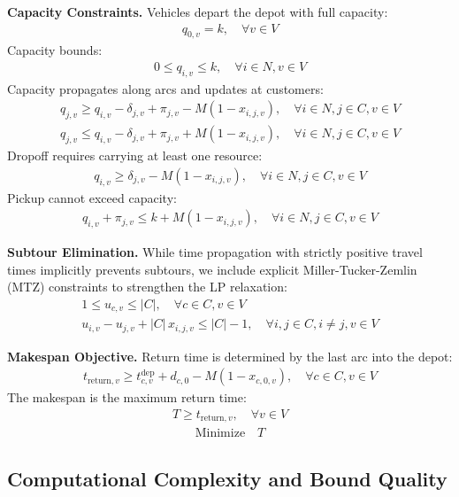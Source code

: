 \documentclass[sigconf]{acmart}
\begin{document}
\textbf{Capacity Constraints.}
Vehicles depart the depot with full capacity:
\begin{align}
q_{0,v} = k,\quad \forall v\in V
\end{align}
Capacity bounds:
\begin{align}
0 \le q_{i,v} \le k,\quad \forall i\in N, v\in V
\end{align}
Capacity propagates along arcs and updates at customers:
\begin{align}
q_{j,v} \ge q_{i,v} - \delta_{j,v} + \pi_{j,v} - M(1-x_{i,j,v}),
\quad \forall i\in N, j\in C, v\in V \\
q_{j,v} \le q_{i,v} - \delta_{j,v} + \pi_{j,v} + M(1-x_{i,j,v}),
\quad \forall i\in N, j\in C, v\in V
\end{align}
Dropoff requires carrying at least one resource:
\begin{align}
q_{i,v} \ge \delta_{j,v} - M(1-x_{i,j,v}),
\quad \forall i\in N, j\in C, v\in V
\end{align}
Pickup cannot exceed capacity:
\begin{align}
q_{i,v} + \pi_{j,v} \le k + M(1-x_{i,j,v}),
\quad \forall i\in N, j\in C, v\in V
\end{align}

\textbf{Subtour Elimination.}
While time propagation with strictly positive travel times implicitly prevents
subtours, we include explicit Miller-Tucker-Zemlin (MTZ) constraints to
strengthen the LP relaxation:
\begin{align}
1 \le u_{c,v} \le |C|,\quad \forall c\in C, v\in V \\
u_{i,v} - u_{j,v} + |C|\,x_{i,j,v} \le |C|-1,\quad \forall i,j\in C, i\ne j, v\in V
\end{align}

\textbf{Makespan Objective.}
Return time is determined by the last arc into the depot:
\begin{align}
t_{\text{return},v} \ge t^{\text{dep}}_{c,v} + d_{c,0} - M(1-x_{c,0,v}),
\quad \forall c\in C, v\in V
\end{align}
The makespan is the maximum return time:
\begin{align}
T \ge t_{\text{return},v},\quad \forall v\in V
\end{align}
\begin{align}
\text{Minimize}\quad T
\end{align}


\subsection{Computational Complexity and Bound Quality}
\end{document}
